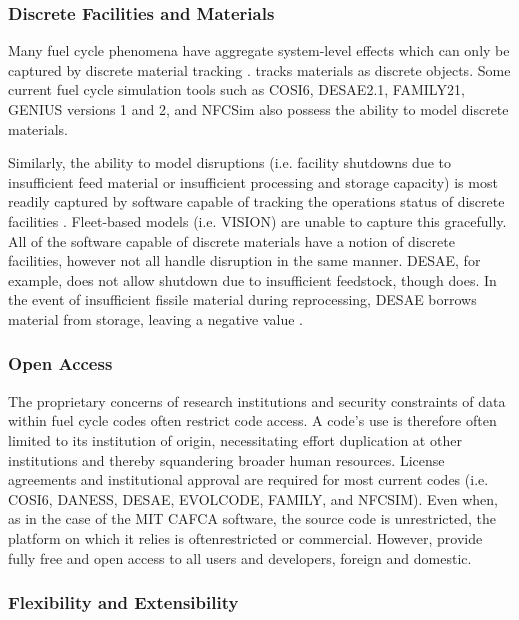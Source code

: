 
\subsubsection{Discrete Facilities and Materials}

Many fuel cycle phenomena have aggregate system-level effects which can only be
captured by discrete material tracking \cite{huff_functions_2010}.  \Cyclus
tracks materials as discrete objects. Some current fuel cycle simulation tools
such as \gls{COSI6}, \gls{DESAE2.1}, \gls{FAMILY21}, \gls{GENIUS} versions 1
and 2, and \gls{NFCSim} also possess the ability to model discrete materials.

Similarly, the ability to model disruptions (i.e. facility shutdowns due to
insufficient feed material or insufficient processing and storage capacity) is
most readily captured by software capable of tracking the operations status of
discrete facilities \cite{huff_functions_2010}.  Fleet-based models (i.e.
\gls{VISION}) are unable to capture this gracefully.  All of the software
capable of discrete materials have a notion of discrete facilities, however not
all handle disruption in the same manner. \gls{DESAE}, for example, does not
allow shutdown due to insufficient feedstock, though \Cyclus does. In the event
of insufficient fissile material during reprocessing, \gls{DESAE} borrows
material from storage, leaving a negative value \cite{macarthy_benchmark_2012}.

\subsubsection{Open Access}

The proprietary concerns of research institutions and security constraints of
data within fuel cycle codes often restrict code access. A code's use is
therefore often limited to its institution of origin, necessitating effort
duplication at other institutions and thereby squandering broader human
resources. License agreements and institutional approval are required for most
current codes (i.e. \gls{COSI}6, \gls{DANESS}, \gls{DESAE}, \gls{EVOLCODE},
\gls{FAMILY}, and \gls{NFCSIM})\cite{juchau_modeling_2010}.  Even when, as in
the case of the MIT \gls{CAFCA} software, the source code is unrestricted, the
platform on which it relies is oftenrestricted or commercial.  However, \Cyclus
provide fully free and open access to all users
and developers, foreign and domestic.

\subsubsection{Flexibility and Extensibility}

